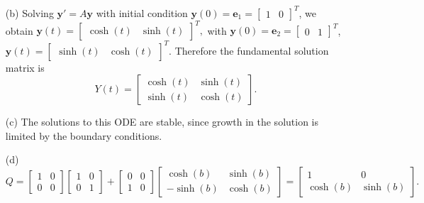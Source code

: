 \begin{sol}
\begin{itemize}
\item[(b)]
  Solving $\mathbf{y}'=A\mathbf{y}$ with
  initial condition $\mathbf{y}(0)=\mathbf{e}_1 =
  \begin{bmatrix}
    1 & 0
  \end{bmatrix}^T
  $, we obtain
  $\mathbf{y}(t)=
  \begin{bmatrix}
    \cosh(t) & \sinh(t)
  \end{bmatrix}^T,
  $
  with $\mathbf{y}(0)=\mathbf{e}_2=
  \begin{bmatrix}
    0 & 1
  \end{bmatrix}^T
$,  $\mathbf{y}(t) =
\begin{bmatrix}
  \sinh(t) &
  \cosh(t)
\end{bmatrix}^T
$.
Therefore the fundamental solution matrix is
    \begin{displaymath}
      Y(t) =
      \begin{bmatrix}
        \cosh(t) & \sinh(t) \\
        \sinh(t) & \cosh(t)
      \end{bmatrix}.
    \end{displaymath}

  \item[(c)]
    The solutions to this ODE are stable,
    since growth in the solution
    is limited by the boundary conditions.

  \item[(d)]
    \begin{displaymath}
      Q =
      \begin{bmatrix}
        1 & 0 \\
        0 & 0
      \end{bmatrix}
      \begin{bmatrix}
        1 & 0 \\
        0 & 1
      \end{bmatrix}
      +
      \begin{bmatrix}
        0 & 0 \\
        1 & 0
      \end{bmatrix}
      \begin{bmatrix}
        \cosh(b) & \sinh(b) \\
        -\sinh(b) & \cosh(b)
      \end{bmatrix} =
      \begin{bmatrix}
        1 & 0 \\
        \cosh(b) & \sinh(b)
      \end{bmatrix}.
    \end{displaymath}


\end{itemize}
\end{sol}
